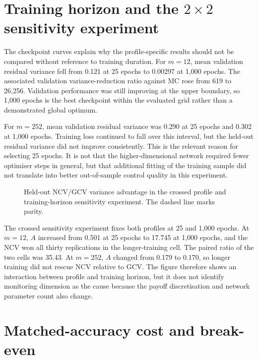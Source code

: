 \section{Training horizon and the $2 \times 2$ sensitivity experiment}

The checkpoint curves explain why the profile-specific results should not be compared without reference to training duration. For $m = 12$, mean validation residual variance fell from 0.121 at 25 epochs to 0.00297 at 1{,}000 epochs. The associated validation variance-reduction ratio against MC rose from 619 to 26{,}256. Validation performance was still improving at the upper boundary, so 1{,}000 epochs is the best checkpoint within the evaluated grid rather than a demonstrated global optimum.

For $m = 252$, mean validation residual variance was 0.290 at 25 epochs and 0.302 at 1{,}000 epochs. Training loss continued to fall over this interval, but the held-out residual variance did not improve consistently. This is the relevant reason for selecting 25 epochs. It is not that the higher-dimensional network required fewer optimiser steps in general, but that additional fitting of the training sample did not translate into better out-of-sample control quality in this experiment.

\begin{figure}[htbp]
    \centering
    \caption{Held-out NCV/GCV variance advantage in the crossed profile and training-horizon sensitivity experiment. The dashed line marks parity.}
    \label{fig:checkpoint_sensitivity}
\end{figure}

The crossed sensitivity experiment fixes both profiles at 25 and 1{,}000 epochs. At $m = 12$, $A$ increased from 0.501 at 25 epochs to 17.745 at 1{,}000 epochs, and the NCV won all thirty replications in the longer-training cell. The paired ratio of the two cells was 35.43. At $m = 252$, $A$ changed from 0.179 to 0.170, so longer training did not rescue NCV relative to GCV. The figure therefore shows an interaction between profile and training horizon, but it does not identify monitoring dimension as the cause because the payoff discretisation and network parameter count also change.

\section{Matched-accuracy cost and break-even}


